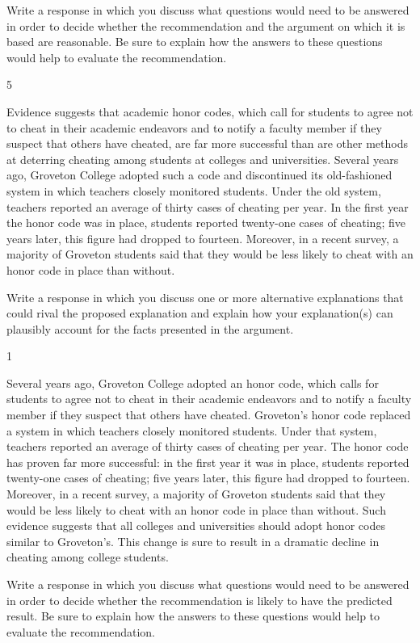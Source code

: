 \documentclass[]{article}
\begin{document}
Write a response in which you discuss what questions would need to be
answered in order to decide whether the recommendation and the argument
on which it is based are reasonable. Be sure to explain how the answers
to these questions would help to evaluate the recommendation.

5

Evidence suggests that academic honor codes, which call for students to
agree not to cheat in their academic endeavors and to notify a faculty
member if they suspect that others have cheated, are far more successful
than are other methods at deterring cheating among students at colleges
and universities. Several years ago, Groveton College adopted such a
code and discontinued its old-fashioned system in which teachers closely
monitored students. Under the old system, teachers reported an average
of thirty cases of cheating per year. In the first year the honor code
was in place, students reported twenty-one cases of cheating; five years
later, this figure had dropped to fourteen. Moreover, in a recent
survey, a majority of Groveton students said that they would be less
likely to cheat with an honor code in place than without.

Write a response in which you discuss one or more alternative
explanations that could rival the proposed explanation and explain how
your explanation(s) can plausibly account for the facts presented in the
argument.

1

Several years ago, Groveton College adopted an honor code, which calls
for students to agree not to cheat in their academic endeavors and to
notify a faculty member if they suspect that others have cheated.
Groveton's honor code replaced a system in which teachers closely
monitored students. Under that system, teachers reported an average of
thirty cases of cheating per year. The honor code has proven far more
successful: in the first year it was in place, students reported
twenty-one cases of cheating; five years later, this figure had dropped
to fourteen. Moreover, in a recent survey, a majority of Groveton
students said that they would be less likely to cheat with an honor code
in place than without. Such evidence suggests that all colleges and
universities should adopt honor codes similar to Groveton's. This change
is sure to result in a dramatic decline in cheating among college
students.

Write a response in which you discuss what questions would need to be
answered in order to decide whether the recommendation is likely to have
the predicted result. Be sure to explain how the answers to these
questions would help to evaluate the recommendation.
\end{document}
